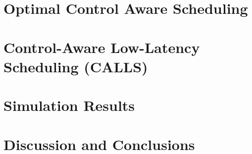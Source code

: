 \documentclass[journal]{IEEEtran}
\begin{document}
\section{Optimal Control Aware Scheduling}\label{sec_optimal}


\section{Control-Aware Low-Latency Scheduling (CALLS)}\label{sec_calls}


\section{Simulation Results}\label{sec_simulation}


\section{Discussion and Conclusions}\label{sec_conclusion}






\end{document}

